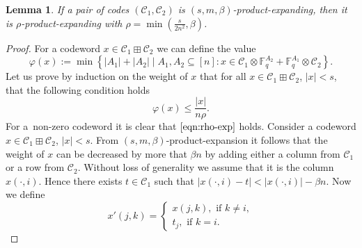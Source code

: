 \documentclass[11pt]{article}
\newcommand{\fbr}[1]{\left\{#1\right\}}
\let\le\leqslant
\let\phi\varphi
\theoremstyle{plain}
\newtheorem{lemma}{Lemma}
\theoremstyle{definition}
\theoremstyle{remark}
\newcommand{\cC}{\mathcal{C}}
\newcommand{\F}{\mathbb{F}}
\begin{document}
\begin{lemma}
    If a pair of codes $(\cC_1,\cC_2)$ is $(s,m,\beta)$-product-expanding, then it is $\rho$-product-expanding with $\rho=\min(\frac{s}{2n^2},\beta)$.
\end{lemma}
\begin{proof}
    For a codeword $x\in \cC_1\boxplus \cC_2$ we can define the value
    $$\phi(x):=\min\fbr{|A_1|+|A_2|\mid A_1,A_2\subseteq [n] : x\in \cC_1\otimes \F_q^{A_2}+\F_q^{A_1}\otimes \cC_2}.$$
    Let us prove by induction on the weight of $x$ that for all $x\in \cC_1\boxplus \cC_2$, $|x|<s$, that the following condition holds \begin{equation}\label{eqn:rho-exp}\phi(x)\le \frac{|x|}{n\rho}.\end{equation} 
    For a~non-zero codeword it is clear that $\eqref{eqn:rho-exp}$ holds. Consider a codeword $x\in \cC_1\boxplus \cC_2$, $|x|< s$. From $(s,m,\beta)$-product-expansion it follows that %
    the weight of $x$ can be decreased by more that $\beta n$ by adding either a column from $\cC_1$ or a row from $\cC_2$. %
    Without loss of generality we assume that it is the column $x(\cdot,i)$. Hence there exists $t\in \cC_1$ such that  $|x(\cdot,i)-t|<|x(\cdot,i)|-\beta n$. Now we define  
    $$x'(j,k)=\begin{cases}x(j,k),\mbox{ if }k\ne i,\\t_j,\mbox{ if }k=i.\end{cases}$$
    

\end{proof}
\end{document}
